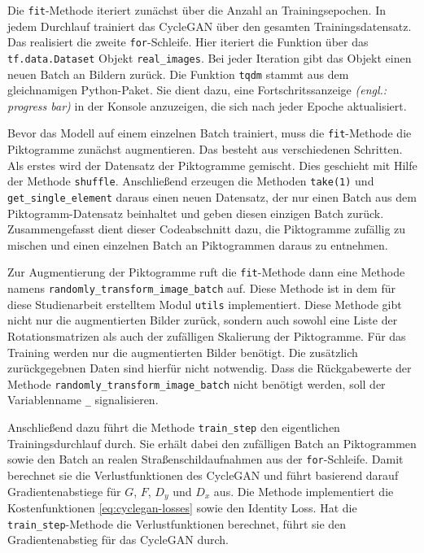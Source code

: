 Die \texttt{fit}-Methode iteriert zunächst über die Anzahl an Trainingsepochen. In jedem Durchlauf trainiert das \ac{CycleGAN} über den gesamten Trainingsdatensatz. Das realisiert die zweite \texttt{for}-Schleife. Hier iteriert die Funktion über das \texttt{tf.data.Dataset} Objekt \texttt{real_images}. Bei jeder Iteration gibt das Objekt einen neuen Batch an Bildern zurück. Die Funktion \texttt{tqdm} stammt aus dem gleichnamigen Python-Paket. Sie dient dazu, eine Fortschritssanzeige \emph{(engl.: progress bar)} in der Konsole anzuzeigen, die sich nach jeder Epoche aktualisiert.

Bevor das Modell auf einem einzelnen Batch trainiert, muss die \texttt{fit}-Methode die Piktogramme zunächst augmentieren. Das besteht aus verschiedenen Schritten. Als erstes wird der Datensatz der Piktogramme gemischt. Dies geschieht mit Hilfe der Methode \texttt{shuffle}. Anschließend erzeugen die Methoden \texttt{take(1)} und \texttt{get_single_element} daraus einen neuen Datensatz, der nur einen Batch aus dem Piktogramm-Datensatz beinhaltet und geben diesen einzigen Batch zurück. Zusammengefasst dient dieser Codeabschnitt dazu, die Piktogramme zufällig zu mischen und einen einzelnen Batch an Piktogrammen daraus zu entnehmen.

Zur Augmentierung der Piktogramme ruft die \texttt{fit}-Methode dann eine Methode namens \texttt{randomly_transform_image_batch} auf. Diese Methode ist in dem für diese Studienarbeit erstelltem Modul \texttt{utils} implementiert. Diese Methode gibt nicht nur die augmentierten Bilder zurück, sondern auch sowohl eine Liste der Rotationsmatrizen als auch der zufälligen Skalierung der Piktogramme. Für das Training werden nur die augmentierten Bilder benötigt. Die zusätzlich zurückgegebnen Daten sind hierfür nicht notwendig. Dass die Rückgabewerte der Methode \texttt{randomly_transform_image_batch} nicht benötigt werden, soll der Variablenname \texttt{_} signalisieren.

Anschließend dazu führt die Methode \texttt{train_step} den eigentlichen Trainingsdurchlauf durch. Sie erhält dabei den zufälligen Batch an Piktogrammen sowie den Batch an realen Straßenschildaufnahmen aus der \texttt{for}-Schleife. Damit berechnet sie die Verlustfunktionen des \ac{CycleGAN} und führt basierend darauf Gradientenabstiege für $G$, $F$, $D_y$ und $D_x$ aus. Die Methode implementiert die Kostenfunktionen \ref{eq:cyclegan-losses} sowie den Identity Loss. Hat die \texttt{train_step}-Methode die Verlustfunktionen berechnet, führt sie den Gradientenabstieg für das \ac{CycleGAN} durch.

